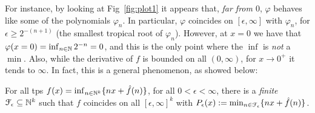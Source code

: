 For instance, by looking at Fig~\ref{fig:plot1} it appears that, \emph{far from $0$}, $\varphi$ behaves like some of the polynomials $\varphi_{n}$.
In particular, %
$\varphi$ coincides on $[\epsilon,\infty]$ with $\varphi_{n}$,
for $\epsilon \geq 2^{-(n+1)}$ (the smallest tropical root of $\varphi_{n}$).
However, at
%
 $x=0$ we have that $\varphi(x=0)=\inf_{n\in\mathbb{N}} 2^{-n}=0$, and this is the only point where the $\inf$ is \emph{not} a $\min$.
Also, while the derivative of $f$ is bounded on all $(0,\infty)$, for $x\to 0^+$ it tends to $\infty$.
In fact, this is a general phenomenon, as showed below:
% 

\begin{theorem}\label{theorem:fepsilon}
For all tps $f(x)=\inf_{n\in \mathbb N^{k}}\{n x+\hat{f}(n)\}$, for all $0<\epsilon<\infty$, there is a \emph{finite} $\mathcal{F}_\epsilon \subseteq \mathbb{N}^k$ such that 
% 
$f$ coincides on all $[\epsilon,\infty]^k$ with $P_\epsilon( x):=\min_{n\in \mathcal{F}_\epsilon}\{n x+\hat{f}(n)\}$.
\end{theorem}


